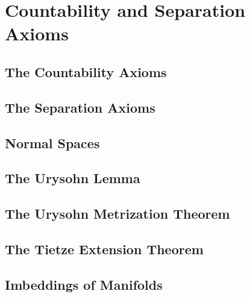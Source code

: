 \chapter{Countability and Separation Axioms}

\section{The Countability Axioms}

\section{The Separation Axioms}

\section{Normal Spaces}

\section{The Urysohn Lemma}

\section{The Urysohn Metrization Theorem}

\section{The Tietze Extension Theorem}

\section{Imbeddings of Manifolds}
